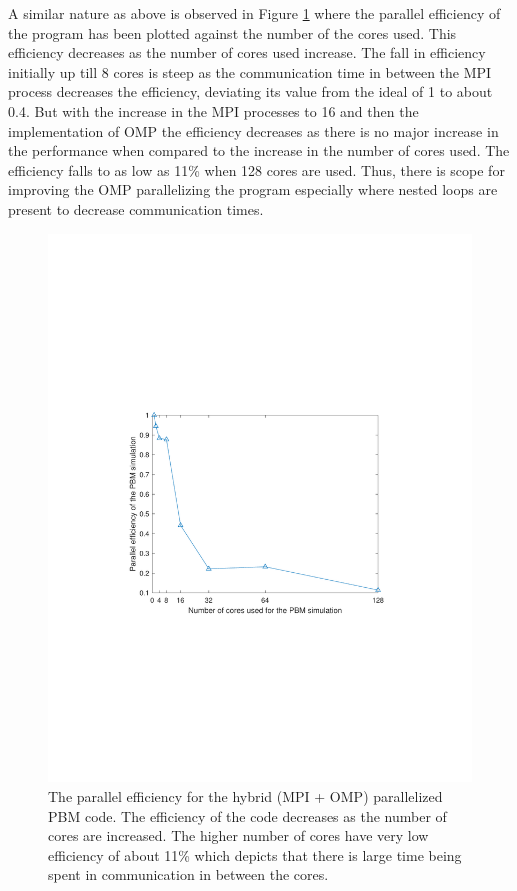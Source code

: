 \documentclass[preprint,11pt,authoryear]{elsarticle}
\begin{document}
A similar nature as above is observed in Figure \ref{fig:rslts_PBM_parallel_efficiency} where the parallel 
efficiency of the program has been plotted against the number of the cores used. This efficiency 
decreases as the number of cores used increase. The fall in efficiency initially up till 8 cores is steep as 
the communication time in between the MPI process decreases the efficiency, deviating its value from 
the ideal of 1 to about 0.4. But with the increase in the MPI processes to 16 and then the 
implementation of OMP the efficiency decreases as there is no major increase in the performance 
when compared to the increase in the number of cores used. The efficiency falls to as low as 11\% 
when 128 cores are used. Thus, there is scope for improving the OMP parallelizing the program 
especially where nested loops are present to decrease communication times.

\begin{figure}
\centering
\includegraphics[scale=0.75]{rslsts_PBM_efficiency.pdf}
\caption{The parallel efficiency for the hybrid (MPI + OMP) parallelized PBM code. The efficiency of the 
code decreases as the number of cores are increased. The higher number of cores have very low 
efficiency of about 11\% which depicts that there is large time being spent in communication in 
between the cores.}
\label{fig:rslts_PBM_parallel_efficiency}
\end{figure}
\end{document}
